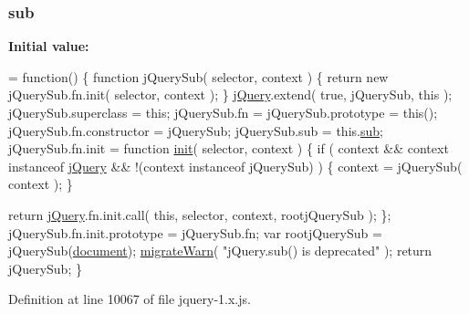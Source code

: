 \subsubsection[{\texorpdfstring{sub}{sub}}]{ sub}\hypertarget{jquery-1_8x_8js_af209492657899aa41078dd2fe4c57575}{}\label{jquery-1_8x_8js_af209492657899aa41078dd2fe4c57575}
{\bfseries Initial value\+:}
\begin{DoxyCode}
= \textcolor{keyword}{function}() \{
    \textcolor{keyword}{function} jQuerySub( selector, context ) \{
        \textcolor{keywordflow}{return} \textcolor{keyword}{new} jQuerySub.fn.init( selector, context );
    \}
    \hyperlink{jquery-1_8x_8js_a2b1d6f9c448e3ce72f4e1865d6e38d2c}{jQuery}.extend( \textcolor{keyword}{true}, jQuerySub, \textcolor{keyword}{this} );
    jQuerySub.superclass = \textcolor{keyword}{this};
    jQuerySub.fn = jQuerySub.prototype = \textcolor{keyword}{this}();
    jQuerySub.fn.constructor = jQuerySub;
    jQuerySub.sub = this.\hyperlink{jquery-1_8x_8js_af209492657899aa41078dd2fe4c57575}{sub};
    jQuerySub.fn.init = \textcolor{keyword}{function} \hyperlink{jquery-1_8x_8js_a4411a3d16c33c71210302860f22ba789}{init}( selector, context ) \{
        \textcolor{keywordflow}{if} ( context && context instanceof \hyperlink{jquery-1_8x_8js_a2b1d6f9c448e3ce72f4e1865d6e38d2c}{jQuery} && !(context instanceof jQuerySub) ) \{
            context = jQuerySub( context );
        \}

        \textcolor{keywordflow}{return} \hyperlink{jquery-1_8x_8js_a2b1d6f9c448e3ce72f4e1865d6e38d2c}{jQuery}.fn.init.call( \textcolor{keyword}{this}, selector, context, rootjQuerySub );
    \};
    jQuerySub.fn.init.prototype = jQuerySub.fn;
    var rootjQuerySub = jQuerySub(\hyperlink{classdocument}{document});
    \hyperlink{jquery-1_8x_8js_ac6036b3100bb484f96bfb15165e077f9}{migrateWarn}( \textcolor{stringliteral}{"jQuery.sub() is deprecated"} );
    \textcolor{keywordflow}{return} jQuerySub;
\}
\end{DoxyCode}


Definition at line 10067 of file jquery-\/1.\+x.\+js.

